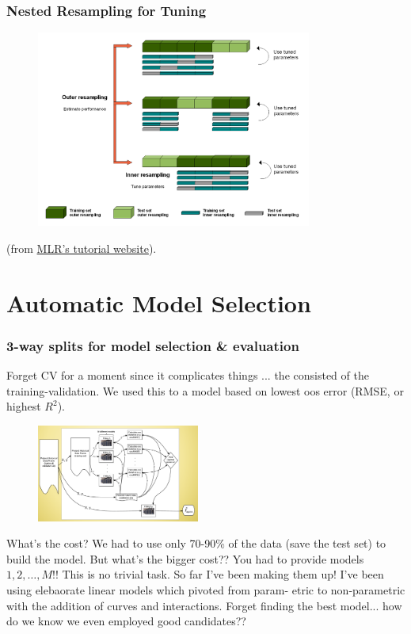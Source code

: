 \documentclass[handout]{beamer}
\begin{document}
\begin{frame}\frametitle{Nested Resampling for Tuning}

\begin{figure}
\centering
\includegraphics[width=3.56in]{nested_resampling_for_tuning.png}
\end{figure}

(from \href{https://mlr-org.github.io/mlr-tutorial/devel/html/nested_resampling/index.html}{MLR's tutorial website}).
\end{frame}

\section{Automatic Model Selection}

\begin{frame}\frametitle{3-way splits for model selection \& evaluation}
\small
Forget CV for a moment since it complicates things ... the  consisted of the training-validation. We used this to  a model based on lowest oos error (RMSE, or highest $R^2$). 

\vspace{-0.2cm}
\begin{figure}
\centering
\includegraphics[width=2.1in]{training_validation}
\end{figure}
\vspace{-0.2cm}
What's the cost? \pause We had to use only 70-90\% of the data (save the test set) to build the model. But what's the bigger cost?? \pause You had to provide models $1, 2, \ldots, M$!! This is no trivial task. So far I've been making them up! I've been using elebaorate linear models which pivoted from param- etric to non-parametric with the addition of curves and interactions. Forget finding the best model... how do we know we even employed good candidates?? \pause {}

\end{frame}
\end{document}
